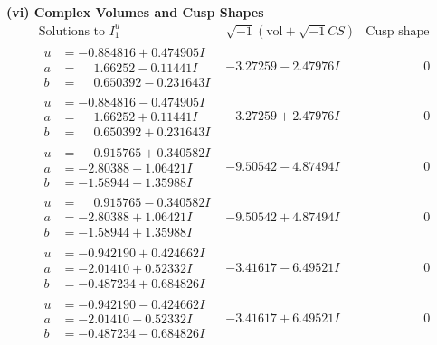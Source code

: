 \documentclass[1p]{elsarticle_modified}
\theoremstyle{definition}
\newcommand{\I}{\sqrt{-1}}
\begin{document}
\newpage\flushleft \textbf{(vi) Complex Volumes and Cusp Shapes}
$$\begin{array}{c|c|c}  
\text{Solutions to }I^u_{1}& \I (\text{vol} + \sqrt{-1}CS) & \text{Cusp shape}\\
 \hline 
\begin{aligned}
u &= -0.884816 + 0.474905 I \\
a &= \phantom{-}1.66252 - 0.11441 I \\
b &= \phantom{-}0.650392 - 0.231643 I\end{aligned}
 & -3.27259 - 2.47976 I & \phantom{-0.000000 } 0 \\ \hline\begin{aligned}
u &= -0.884816 - 0.474905 I \\
a &= \phantom{-}1.66252 + 0.11441 I \\
b &= \phantom{-}0.650392 + 0.231643 I\end{aligned}
 & -3.27259 + 2.47976 I & \phantom{-0.000000 } 0 \\ \hline\begin{aligned}
u &= \phantom{-}0.915765 + 0.340582 I \\
a &= -2.80388 - 1.06421 I \\
b &= -1.58944 - 1.35988 I\end{aligned}
 & -9.50542 - 4.87494 I & \phantom{-0.000000 } 0 \\ \hline\begin{aligned}
u &= \phantom{-}0.915765 - 0.340582 I \\
a &= -2.80388 + 1.06421 I \\
b &= -1.58944 + 1.35988 I\end{aligned}
 & -9.50542 + 4.87494 I & \phantom{-0.000000 } 0 \\ \hline\begin{aligned}
u &= -0.942190 + 0.424662 I \\
a &= -2.01410 + 0.52332 I \\
b &= -0.487234 + 0.684826 I\end{aligned}
 & -3.41617 - 6.49521 I & \phantom{-0.000000 } 0 \\ \hline\begin{aligned}
u &= -0.942190 - 0.424662 I \\
a &= -2.01410 - 0.52332 I \\
b &= -0.487234 - 0.684826 I\end{aligned}
 & -3.41617 + 6.49521 I & \phantom{-0.000000 } 0 \\ \hline\begin{aligned}

\end{aligned}
\end{array}$$
\end{document}
